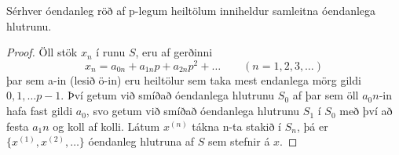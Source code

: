\begin{hjalparsetn}
Sérhver óendanleg röð af p-legum heiltölum inniheldur samleitna óendanlega hlutrunu. 
\end{hjalparsetn}
\begin{proof}
Öll stök $x_n$ í runu $S$, eru af gerðinni
\begin{equation*}
x_n = a_{0n} + a_{1n}p+a_{2n}p^2 + \ldots \qquad (n= 1,2,3,\ldots)
\end{equation*}
þar sem a-in (lesið ö-in) eru heiltölur sem taka mest endanlega mörg gildi $0,1, \ldots p-1$.
Því getum við smíðað óendanlega hlutrunu $S_0$ af þar sem öll $a_0n$-in hafa fast gildi $a_0$, svo getum við 
smíðað óendanlega hlutrunu $S_1$ í $S_0$ með því að festa $a_1n$ og koll af kolli.
Látum $x^{(n)}$ tákna n-ta stakið í $S_n$, þá er $\{x^{(1)},x^{(2)},\ldots \}$ óendanleg hlutruna af $S$ sem stefnir á $x$. 
\end{proof}


